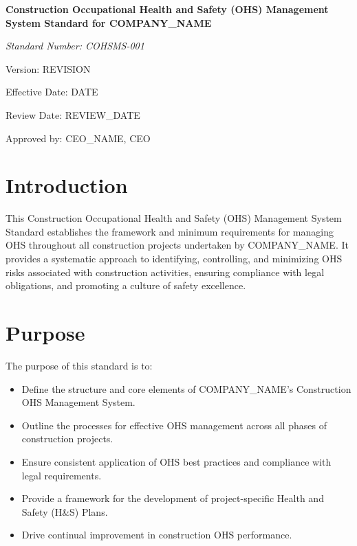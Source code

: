 \documentclass[12pt]{article}
\begin{document}
\begin{titlepage}
    \centering
    \vspace*{2cm}
    {\LARGE\bfseries Construction Occupational Health and Safety (OHS) Management System Standard for {{COMPANY_NAME}}\par}
    \vspace{1cm}
    {\large\itshape Standard Number: COHSMS-001\par}
    \vspace{0.5cm}
    {\normalsize Version: {{REVISION}}\par}
    \vspace{0.5cm}
    {\normalsize Effective Date: {{DATE}}\par}
    \vspace{0.5cm}
    {\normalsize Review Date: {{REVIEW_DATE}}\par}
    \vspace{2cm}
    {\normalsize Approved by: {{CEO_NAME}}, CEO\par}
\end{titlepage}

\section{Introduction}
This Construction Occupational Health and Safety (OHS) Management System Standard establishes the framework and minimum requirements for managing OHS throughout all construction projects undertaken by {{COMPANY_NAME}}. It provides a systematic approach to identifying, controlling, and minimizing OHS risks associated with construction activities, ensuring compliance with legal obligations, and promoting a culture of safety excellence.

\section{Purpose}
The purpose of this standard is to:
\begin{itemize}
    \item Define the structure and core elements of {{COMPANY_NAME}}'s Construction OHS Management System.
    \item Outline the processes for effective OHS management across all phases of construction projects.
    \item Ensure consistent application of OHS best practices and compliance with legal requirements.
    \item Provide a framework for the development of project-specific Health and Safety (H\&S) Plans.
    \item Drive continual improvement in construction OHS performance.
\end{itemize}
\end{document}
